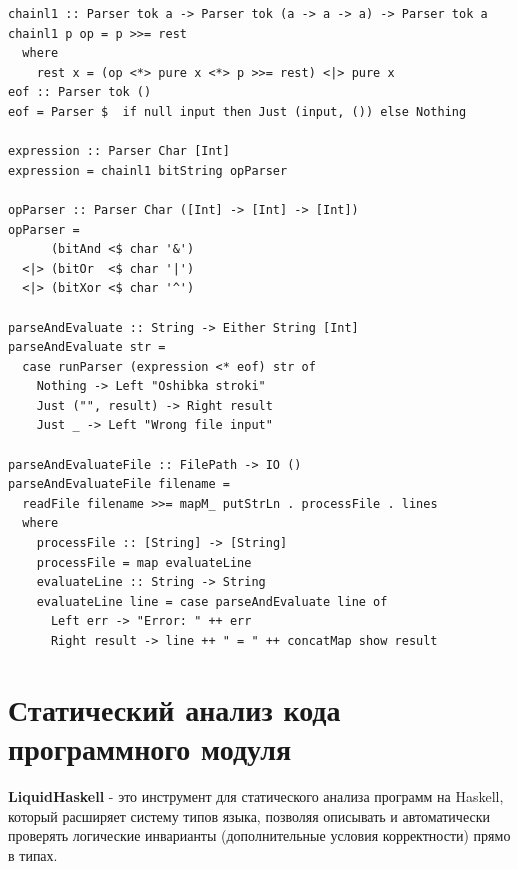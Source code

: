 \documentclass[areasetadvanced]{scrartcl}
\begin{document}
\begin{lstlisting}[caption={Lib.hs}, label=lst:main]
chainl1 :: Parser tok a -> Parser tok (a -> a -> a) -> Parser tok a
chainl1 p op = p >>= rest
  where
    rest x = (op <*> pure x <*> p >>= rest) <|> pure x
eof :: Parser tok ()
eof = Parser $  if null input then Just (input, ()) else Nothing

expression :: Parser Char [Int]
expression = chainl1 bitString opParser

opParser :: Parser Char ([Int] -> [Int] -> [Int])
opParser =
      (bitAnd <$ char '&')
  <|> (bitOr  <$ char '|')
  <|> (bitXor <$ char '^')

parseAndEvaluate :: String -> Either String [Int]
parseAndEvaluate str =
  case runParser (expression <* eof) str of
    Nothing -> Left "Oshibka stroki"
    Just ("", result) -> Right result
    Just _ -> Left "Wrong file input"

parseAndEvaluateFile :: FilePath -> IO ()
parseAndEvaluateFile filename =
  readFile filename >>= mapM_ putStrLn . processFile . lines
  where
    processFile :: [String] -> [String]
    processFile = map evaluateLine
    evaluateLine :: String -> String
    evaluateLine line = case parseAndEvaluate line of
      Left err -> "Error: " ++ err
      Right result -> line ++ " = " ++ concatMap show result
\end{lstlisting}
\newpage
\section{Статический анализ кода программного модуля}
\textbf{LiquidHaskell} - это инструмент для статического анализа программ на Haskell, который расширяет систему типов языка, позволяя описывать и автоматически проверять логические инварианты (дополнительные условия корректности) прямо в типах.
\end{document}
